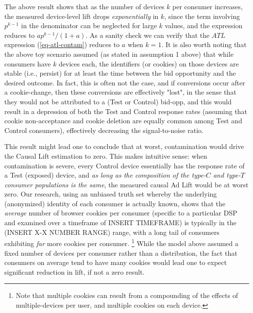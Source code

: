 \documentclass[11pt,a4paper]{article}
\theoremstyle{definition}
\theoremstyle{remark}
\theoremstyle{definition}
\theoremstyle{definition}
\theoremstyle{definition}
\theoremstyle{definition}
\theoremstyle{definition}
\theoremstyle{definition}
\begin{document}
The above result shows that as the number of devices $k$ per consumer increases, the measured device-level lift drops \textit{exponentially} in $k$, since the term involving $p^{k-1}$ in the denominator can be neglected for large $k$ values, and the expression reduces to $a p^{k-1}/(1 + a)$. As a sanity check we can verify that the $ATL$ expression (\ref{eq-atl-contam}) reduces to $a$ when $k=1$. It is also worth noting that the above toy scenario assumed (as stated in assumption 1 above) that while consumers have $k$ devices each, the identifiers (or cookies) on those devices are stable (i.e., persist) for at least the time between the bid opportunity and the desired outcome. In fact, this is often not the case, and if conversions occur after a cookie-change, then these conversions are effectively "lost", in the sense that they would not be attributed to a (Test or Control) bid-opp, and this would result in a depression of both the Test and Control response rates (assuming that cookie non-acceptance and cookie deletion are equally common among Test and Control consumers), effectively decreasing the signal-to-noise ratio.

This result might lead one to conclude that at worst, contamination would drive the Causal Lift estimation to zero. 
This makes intuitive sense: when contamination is severe, every Control device essentially has the response rate of a Test (exposed) device, and \textit{as long as the composition of the type-$C$ and type-$T$ consumer populations is the same}, the measured causal Ad Lift would be at worst zero. Our research, using an unbiased truth set whereby the underlying (anonymized) identity of each consumer is actually known, shows that the {\em average} number of browser cookies per consumer (specific to a particular DSP and examined over a timeframe of INSERT TIMEFRAME) is typically in the (INSERT X-X NUMBER RANGE) range, with a long tail of consumers exhibiting {\em far} more cookies per consumer.
\footnote{Note that multiple cookies can result from a compounding of the effects of multiple-devices per user, and multiple cookies on each device.}
While the model above assumed a fixed number of devices per consumer rather than a distribution, the fact that consumers on average tend to have many cookies would lead one to expect significant reduction in lift, if not a zero result. 
\end{document}

